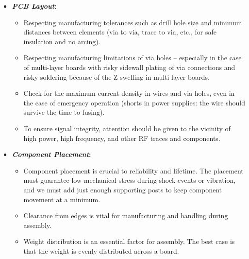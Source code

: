 \begin{itemize}[topsep=4pt,itemsep=2pt,partopsep=2pt, parsep=2pt]

    \item \textbf{\emph{\ac{PCB} Layout}:}
    \begin{itemize}[topsep=4pt,itemsep=2pt,partopsep=2pt, parsep=2pt]

        \item Respecting manufacturing tolerances such as drill
        hole size and minimum distances between elements (via to via, trace to
        via, etc., for safe insulation and no arcing).

        \item  Respecting manufacturing limitations of via holes – especially
        in the case of multi-layer boards with risky sidewall plating of via
        connections and risky soldering because of the Z swelling in multi-layer
        boards.

        \item Check for the maximum current density in wires and via holes, even
        in the case of emergency operation (shorts in power supplies: the wire
        should survive the time to fusing).

        \item To ensure signal integrity, attention should be given to the
        vicinity of high power, high frequency, and other \ac{RF} traces and
        components.

    \end{itemize}

    \item \textbf{\emph{Component Placement}:}
    \begin{itemize}[topsep=4pt,itemsep=2pt,partopsep=2pt, parsep=2pt]

        \item Component placement is crucial to reliability and lifetime.
        The placement must guarantee low mechanical stress during shock events
        or vibration, and we must add just enough supporting posts to keep
        component movement at a minimum.

        \item Clearance from edges is vital for manufacturing and
        handling during assembly.

        \item Weight distribution is an essential factor for assembly. The best
        case is that the weight is evenly distributed across a board.


\end{itemize}
\end{itemize}
